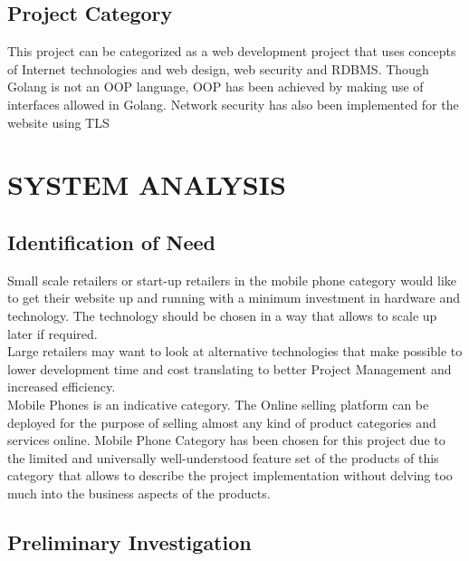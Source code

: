 \documentclass[hidelinks,a4paper,12pt]{article}
\begin{document}
\subsection{Project Category}

This project can be categorized as a web development project that uses concepts of Internet technologies and \gls{web design}, \gls{web security} and \Gls{RDBMS}. Though Golang is not an \Gls{OOP} language, OOP has been achieved by making use of interfaces allowed in Golang. \Gls{Network security} has also been implemented for the website using \Gls{TLS}

\newpage


\section{\MakeUppercase{System Analysis}}

\subsection{Identification of Need}

Small scale retailers or start-up retailers in the mobile phone category would like to get their website up and running with a minimum investment in hardware and technology. The technology should be chosen in a way that allows to scale up later if required.
\\

Large retailers may want to look at alternative technologies that make possible to lower development time and cost translating to better Project Management and increased efficiency.
\\

Mobile Phones is an indicative category. The Online selling platform can be deployed for the purpose of selling almost any kind of product categories and services online. Mobile Phone Category has been chosen for this project due to the limited and universally well-understood feature set of the products of this category that allows to describe the project implementation without delving too much into the business aspects of the products.
\\

\subsection{Preliminary Investigation}
\end{document}
